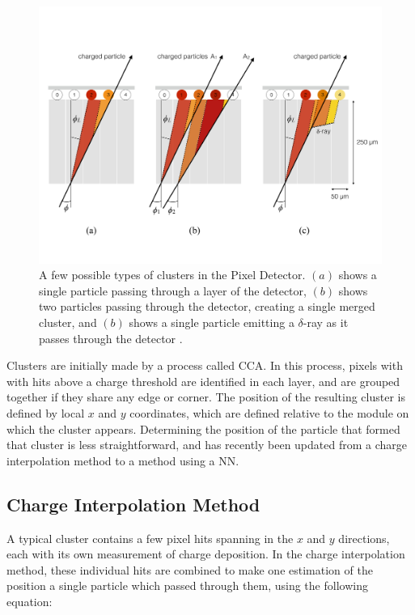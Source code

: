 \begin{centering}
\begin{figure}[bth]
\myfloatalign
\includegraphics[width=.90\linewidth]{figures/nn/cluster_types.pdf}
\caption{A few possible types of clusters in the Pixel Detector. $(a)$ shows a single particle passing through a layer of the detector, $(b)$ shows two particles passing through the detector, creating a single merged cluster, and $(b)$ shows a single particle emitting a $\delta$-ray as it passes through the detector \cite{PERF-2012-05}.}
\label{fig:cluster_types}
\end{figure}
\end{centering}

Clusters are initially made by a process called \acf{CCA}. In this process, pixels with with hits above a charge threshold are identified in each layer, and are grouped together if they share any edge or corner. The position of the resulting cluster is defined by local $x$ and $y$ coordinates, which are defined relative to the module on which the cluster appears. Determining the position of the particle that formed that cluster is less straightforward, and has recently been updated from a charge interpolation method to a method using a \acf{NN}. 

\subsection{Charge Interpolation Method}

A typical cluster contains a few pixel hits spanning in the $x$ and $y$ directions, each with its own measurement of charge deposition. In the charge interpolation method, these individual hits are combined to make one estimation of the position a single particle which passed through them, using the following equation: 


